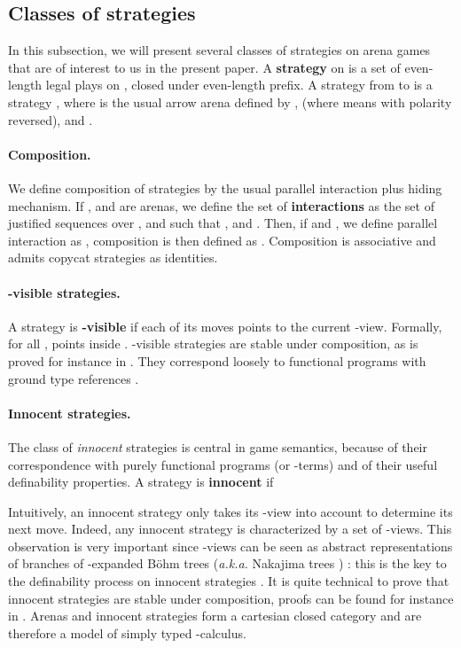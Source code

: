 \documentclass{article}
\begin{document}
\subsection{Classes of strategies}

In this subsection, we will present several classes of strategies on arena games that are of interest to us in the present paper. 
A \textbf{strategy}  on  is a set of even-length legal plays on , closed under even-length prefix. A strategy from  to 
is a strategy , where  is the usual arrow arena defined by ,  (where
 means  with polarity  reversed),  and .

\paragraph{Composition.} We define composition of strategies by the usual parallel interaction plus hiding mechanism.
If ,  and  are arenas, we define the set of \textbf{interactions}
 as the set of justified sequences  over , 
and  such that ,
 and
. Then, if 
and , we define parallel interaction as ,
composition is then defined as . Composition is associative and admits copycat strategies 
as identities.

\paragraph{-visible strategies.} A strategy  is \textbf{-visible} if each of its moves points to the current -view. Formally, for all ,
 points inside . -visible strategies are stable under composition, as is proved for instance in \cite{harmer2004innocent}. They
correspond loosely to functional programs with ground type references \cite{abramsky-mccusker:active-algol}.

\paragraph{Innocent strategies.}
The class of \emph{innocent} strategies is central in game semantics, because of their correspondence with purely functional programs (or 
-terms) and of their useful definability properties. A strategy  is \textbf{innocent} if 

Intuitively, an innocent strategy only takes its -view into account to determine its next move. Indeed, any innocent strategy is characterized by
a set of -views. This observation is very important since -views can be seen as abstract representations of branches of -expanded Böhm trees
(\emph{a.k.a.} Nakajima trees \cite{nakajima1975infinite}) : this is the key to the definability process on innocent strategies \cite{hyland-ong}. It is quite technical to prove that
innocent strategies are stable under composition, proofs can be found for instance in \cite{harmer2004innocent,phd}. Arenas and innocent strategies form a cartesian closed category and
are therefore a model of simply typed -calculus.
\end{document}
